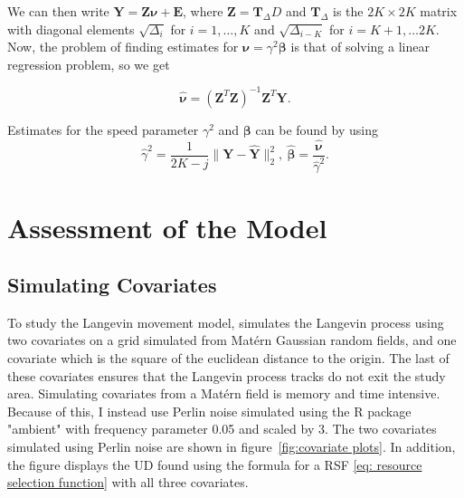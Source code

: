 We can then write $\mathbf{Y} = \mathbf{Z} \bm{\nu} + \mathbf{E}$, where $\mathbf{Z} = \mathbf{T}_\Delta D$ and $\mathbf{T}_\Delta$ is the $2K\times 2K$ matrix with diagonal elements $\sqrt{\Delta_i}$ for $i=1, \dots, K$ and $\sqrt{\Delta_{i-K}}$ for $i=K+1,\dots 2K$. Now, the problem of finding estimates for $\bm{\nu} = \gamma^2 \bm{\beta}$ is that of solving a linear regression problem, so we get

$$
\bm{\hat{\nu}} = (\mathbf{Z}^T\mathbf{Z})^{-1}\mathbf{Z}^T \mathbf{Y}.
$$

Estimates for the speed parameter $\gamma^2$ and $\bm{\beta}$ can be found by using
$$
\hat{\gamma}^2 = \frac{1}{2K-j} \lVert \mathbf{Y} - \mathbf{\hat{Y}} \rVert^2_2, \ 
\bm{\hat{\beta}} = \frac{\bm{\hat{\nu}}}{\hat{\gamma}^2}.
\label{eq: michelot estimates}
$$



\section{Assessment of the Model}

\subsection{Simulating Covariates}
To study the Langevin movement model, \parencite{michelot_langevin_2019} simulates the Langevin process using two covariates on a grid simulated from  Matérn Gaussian random fields, and one covariate which is the square of the euclidean distance to the origin. The last of these covariates ensures that the Langevin process tracks do not exit the study area. Simulating covariates from a Matérn field is memory and time intensive. Because of this, I instead use Perlin noise simulated using the R package "ambient" with frequency parameter 0.05 and scaled by 3. The two covariates simulated using Perlin noise are shown in figure~\ref{fig:covariate plots}. In addition, the figure displays the UD found using the formula for a RSF \eqref{eq: resource selection function} with all three covariates.

